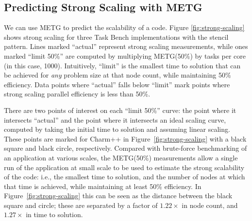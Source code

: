{\color{blue}
\subsection{Predicting Strong Scaling with METG}




We can use METG to predict the scalability of a code. Figure
\ref{fig:strong-scaling} shows strong scaling for three Task Bench
implementations with the stencil pattern. Lines marked ``actual''
represent strong scaling measurements, while ones marked ``limit 50\%'' are
computed by multiplying METG(50\%) by tasks per core (in this case,
1000). Intuitively, ``limit'' is the smallest time to solution that
can be achieved for \emph{any} problem size at that node count, while
maintaining 50\% efficiency. Data points where ``actual'' falls below
``limit'' mark points where strong scaling parallel efficiency is less
than 50\%.

There are two points of interest on each ``limit 50\%'' curve: the point
where it intersects ``actual'' and the point where it intersects an
ideal scaling curve, computed by taking the initial time to solution
and assuming linear scaling. These points are marked for Charm++ in
Figure~\ref{fig:strong-scaling} with a black square and black circle,
respectively.
Compared with brute-force benchmarking of an application at various
scales, the METG(50\%) measurements allow a single run of the
application at small scale to be used to estimate the strong scalability
of the code:
i.e., the smallest time to solution,
and the number of nodes at which that time is achieved, while
maintaining at least 50\% efficiency. In
Figure~\ref{fig:strong-scaling} this can be seen as the distance
between the black square and circle; these are separated by a factor of
$1.22\times$ in node count, and $1.27\times$ in time to solution.

}
